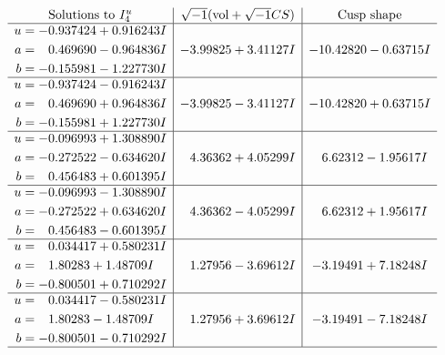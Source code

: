 \documentclass[1p]{elsarticle_modified}
\theoremstyle{definition}
\newcommand{\I}{\sqrt{-1}}
\begin{document}
$$\begin{array}{c|c|c}  
\text{Solutions to }I^u_{4}& \I (\text{vol} + \sqrt{-1}CS) & \text{Cusp shape}\\
 \hline 
\begin{aligned}
u &= -0.937424 + 0.916243 I \\
a &= \phantom{-}0.469690 - 0.964836 I \\
b &= -0.155981 - 1.227730 I\end{aligned}
 & -3.99825 + 3.41127 I & -10.42820 - 0.63715 I \\ \hline\begin{aligned}
u &= -0.937424 - 0.916243 I \\
a &= \phantom{-}0.469690 + 0.964836 I \\
b &= -0.155981 + 1.227730 I\end{aligned}
 & -3.99825 - 3.41127 I & -10.42820 + 0.63715 I \\ \hline\begin{aligned}
u &= -0.096993 + 1.308890 I \\
a &= -0.272522 - 0.634620 I \\
b &= \phantom{-}0.456483 + 0.601395 I\end{aligned}
 & \phantom{-}4.36362 + 4.05299 I & \phantom{-}6.62312 - 1.95617 I \\ \hline\begin{aligned}
u &= -0.096993 - 1.308890 I \\
a &= -0.272522 + 0.634620 I \\
b &= \phantom{-}0.456483 - 0.601395 I\end{aligned}
 & \phantom{-}4.36362 - 4.05299 I & \phantom{-}6.62312 + 1.95617 I \\ \hline\begin{aligned}
u &= \phantom{-}0.034417 + 0.580231 I \\
a &= \phantom{-}1.80283 + 1.48709 I \\
b &= -0.800501 + 0.710292 I\end{aligned}
 & \phantom{-}1.27956 - 3.69612 I & -3.19491 + 7.18248 I \\ \hline\begin{aligned}
u &= \phantom{-}0.034417 - 0.580231 I \\
a &= \phantom{-}1.80283 - 1.48709 I \\
b &= -0.800501 - 0.710292 I\end{aligned}
 & \phantom{-}1.27956 + 3.69612 I & -3.19491 - 7.18248 I\\
 \hline 
 \end{array}$$\newpage
\end{document}
